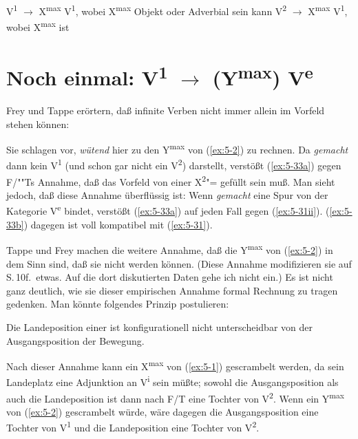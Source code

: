 \documentclass[output=paper]{LSP/langsci}
\begin{document}
\begin{exe}
\ex%
\label{ex:5-32}
\begin{xlisti}
\ex%
\label{ex:5-32i}
V\textsuperscript{1} ${\rightarrow}$
X\textsuperscript{max} V\textsuperscript{1}, wobei
X\textsuperscript{max} Objekt oder Adverbial sein kann
\ex%
\label{ex:5-32ii}
V\textsuperscript{2} ${\rightarrow}$
X\textsuperscript{max} V\textsuperscript{1}, wobei
X\textsuperscript{max}  ist
\end{xlisti}
\end{exe}

\section{Noch einmal: V\textsuperscript{1} ${\rightarrow}$ (Y\textsuperscript{max}) V\textsuperscript{e}}%
\label{sec:5-3}

Frey und Tappe erörtern, daß infinite Verben nicht immer allein im Vorfeld stehen können:

\begin{exe}
\ex%
\label{ex:5-33}
\begin{xlist}
\end{xlist}
\end{exe}
Sie schlagen vor, \textit{wütend} hier zu den Y\textsuperscript{max}
von (\ref{ex:5-2}) zu rechnen. Da \textit{gemacht} dann kein V\textsuperscript{1}
(und schon gar nicht ein V\textsuperscript{2}) darstellt, verstößt
(\ref{ex:5-33a}) gegen F/""Ts Annahme, daß das Vorfeld von einer
X\textsuperscript{2}{}"= gefüllt sein muß. Man sieht
jedoch, daß diese Annahme überflüssig ist: Wenn \textit{gemacht} eine
Spur von der Kategorie V\textsuperscript{e} bindet, verstößt (\ref{ex:5-33a}) auf
jeden Fall gegen (\ref{ex:5-31ii}). (\ref{ex:5-33b}) dagegen ist voll kompatibel mit (\ref{ex:5-31}).

Tappe und Frey machen die weitere Annahme, daß die
Y\textsuperscript{max} von (\ref{ex:5-2}) in dem Sinn  sind, daß sie
nicht  werden können. (Diese Annahme modifizieren sie auf
S.\,10f.\ etwas. Auf die dort diskutierten Daten gehe ich nicht ein.) Es
ist nicht ganz deutlich, wie sie dieser empirischen Annahme formal
Rechnung zu tragen gedenken. Man könnte folgendes Prinzip postulieren:

\begin{exe}
\ex%
\label{ex:5-34}
Die Landeposition einer  ist konfigurationell nicht unterscheidbar von der Ausgangsposition der Bewegung.
\end{exe}
Nach dieser Annahme kann ein X\textsuperscript{max} von (\ref{ex:5-1}) gescrambelt werden, da sein Landeplatz eine Adjunktion an V\textsuperscript{i} sein müßte; sowohl die Ausgangsposition als auch die Landeposition ist dann nach F/T eine Tochter von V\textsuperscript{2}. Wenn ein Y\textsuperscript{max} von (\ref{ex:5-2}) gescrambelt würde, wäre dagegen die Ausgangsposition eine Tochter von V\textsuperscript{1} und die Landeposition eine Tochter von V\textsuperscript{2}.
\end{document}
